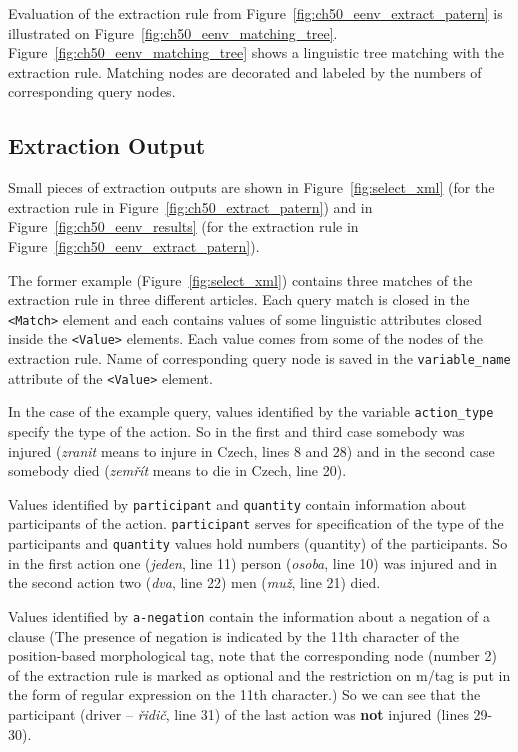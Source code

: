 Evaluation of the extraction rule from Figure~\ref{fig:ch50_eenv_extract_patern} is illustrated on Figure~\ref{fig:ch50_eenv_matching_tree}. Figure~\ref{fig:ch50_eenv_matching_tree} shows a linguistic tree matching with the extraction rule. Matching nodes are decorated and labeled by the numbers of corresponding query nodes.


\subsection{Extraction Output}

Small pieces of extraction outputs are shown in Figure~\ref{fig:select_xml} (for the extraction rule in Figure~\ref{fig:ch50_extract_patern}) and in Figure~\ref{fig:ch50_eenv_results} (for the extraction rule in Figure~\ref{fig:ch50_eenv_extract_patern}). 

The former example (Figure~\ref{fig:select_xml}) contains three matches of the extraction rule in three different articles. Each query match is closed in the \verb+<Match>+ element and each contains values of some linguistic attributes closed inside the \verb+<Value>+ elements. Each value comes from some of the nodes of the extraction rule. Name of corresponding query node is saved in the \verb+variable_name+ attribute of the \verb+<Value>+ element.

In the case of the example query, values identified by the variable \verb+action_type+ specify the type of the action. So in the first and third case somebody was injured (\emph{zranit} means to injure in Czech, lines 8 and 28) and in the second case somebody died (\emph{zemřít} means to die in Czech, line 20).

Values identified by \verb+participant+ and \verb+quantity+ contain information about participants of the action. \verb+participant+ serves for specification of the type of the participants and \verb+quantity+ values hold numbers (quantity) of the participants. So in the first action one (\emph{jeden}, line 11) person (\emph{osoba}, line 10) was injured and in the second action two (\emph{dva}, line 22) men (\emph{muž}, line 21) died.

Values identified by \verb+a-negation+ contain the information about a negation of a clause (The presence of negation is indicated by the 11th character of the position-based morphological tag, note that the corresponding node (number 2) of the extraction rule is marked as optional and the restriction on m/tag is put in the form of regular expression on the 11th character.) So we can see that the participant (driver -- \emph{řidič}, line 31) of the last action was \textbf{not} injured (lines 29-30).

